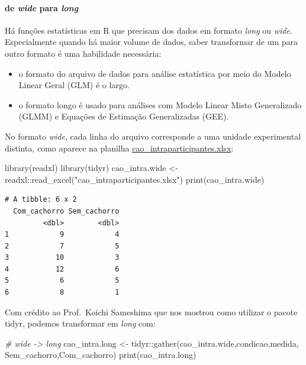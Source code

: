 \documentclass[
]{article}
\newenvironment{Shaded}{\begin{snugshade}}{\end{snugshade}}
\newcommand{\CommentTok}[1]{\textcolor[rgb]{0.56,0.35,0.01}{\textit{#1}}}
\newcommand{\FunctionTok}[1]{\textcolor[rgb]{0.00,0.00,0.00}{#1}}
\newcommand{\NormalTok}[1]{#1}
\newcommand{\OtherTok}[1]{\textcolor[rgb]{0.56,0.35,0.01}{#1}}
\newcommand{\SpecialCharTok}[1]{\textcolor[rgb]{0.00,0.00,0.00}{#1}}
\newcommand{\StringTok}[1]{\textcolor[rgb]{0.31,0.60,0.02}{#1}}
\providecommand{\tightlist}{%
  \setlength{\itemsep}{0pt}\setlength{\parskip}{0pt}}
\begin{document}
\hypertarget{de-wide-para-long}{%
\paragraph{\texorpdfstring{de \emph{wide} para
\emph{long}}{de wide para long}}\label{de-wide-para-long}}

Há funções estatísticas em R que precisam dos dados em formato
\emph{long} ou \emph{wide}. Especialmente quando há maior volume de
dados, saber transformar de um para outro formato é uma habilidade
necessária:

\begin{itemize}
\tightlist
\item
  o formato do arquivo de dados para análise estatística por meio do
  Modelo Linear Geral (GLM) é o largo.
\item
  o formato longo é usado para análises com Modelo Linear Misto
  Generalizado (GLMM) e Equações de Estimação Generalizadas (GEE).
\end{itemize}

No formato \emph{wide}, cada linha do arquivo corresponde a uma unidade
experimental distinta, como aparece na planilha
\url{cao_intraparticipantes.xlsx}:

\begin{Shaded}
\begin{Highlighting}[]
\FunctionTok{library}\NormalTok{(readxl)}
\FunctionTok{library}\NormalTok{(tidyr)}
\NormalTok{cao\_intra.wide }\OtherTok{\textless{}{-}}\NormalTok{ readxl}\SpecialCharTok{::}\FunctionTok{read\_excel}\NormalTok{(}\StringTok{"cao\_intraparticipantes.xlsx"}\NormalTok{)}
\FunctionTok{print}\NormalTok{(cao\_intra.wide)}
\end{Highlighting}
\end{Shaded}

\begin{verbatim}
# A tibble: 6 x 2
  Com_cachorro Sem_cachorro
         <dbl>        <dbl>
1            9            4
2            7            5
3           10            3
4           12            6
5            6            5
6            8            1
\end{verbatim}

Com crédito ao Prof.~Koichi Sameshima que nos mostrou como utilizar o
pacote tidyr, podemos transformar em \emph{long} com:

\begin{Shaded}
\begin{Highlighting}[]
\CommentTok{\# wide {-}\textgreater{} long}
\NormalTok{cao\_intra.long }\OtherTok{\textless{}{-}}\NormalTok{ tidyr}\SpecialCharTok{::}\FunctionTok{gather}\NormalTok{(cao\_intra.wide,condicao,medida,}
\NormalTok{                            Sem\_cachorro,Com\_cachorro)}
\FunctionTok{print}\NormalTok{(cao\_intra.long)}
\end{Highlighting}
\end{Shaded}
\end{document}
